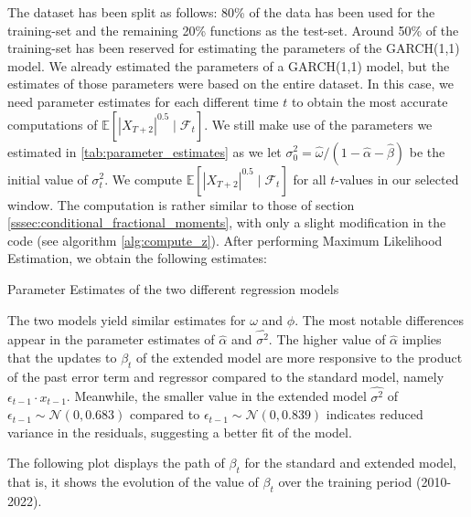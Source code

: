 The dataset has been split as follows: 80\% of the data has been used for the training-set and the remaining 20\% functions as the test-set. Around 50\% of the training-set has been reserved for estimating the parameters of the GARCH(1,1) model. We already estimated the parameters of a GARCH(1,1) model, but the estimates of those parameters were based on the entire dataset. In this case, we need parameter estimates for each different time \(t\) to obtain the most accurate computations of \(\mathbb{E}[|X_{T + 2}|^{0.5} \mid \mathcal{F}_t]\). We still make use of the parameters we estimated in \ref{tab:parameter_estimates} as we let \(\sigma^2_0 = \hat{\omega} / ( 1 - \hat{\alpha} - \hat{\beta})\) be the initial value of \(\sigma^2_t\). We compute \(\mathbb{E}[|X_{T + 2}|^{0.5} \mid \mathcal{F}_t]\) for all \(t\)-values in our selected window. The computation is rather similar to those of section \ref{sssec:conditional_fractional_moments}, with only a slight modification in the code (see algorithm \ref{alg:compute_z}).
After performing Maximum Likelihood Estimation, we obtain the following estimates:
\begin{table}[H]
    \centering

\caption{Parameter Estimates of the two different regression models} 
\label{tab:observation_model}
\end{table}
The two models yield similar estimates for \(\omega\) and \(\phi\). 
The most notable differences appear in the parameter estimates of \(\hat{\alpha}\) and \(\hat{\sigma^2}\). The higher value of  \(\hat{\alpha}\) implies that the updates to \(\beta_t\) of the extended model are more responsive to the product of the past error term and regressor compared to the standard model, namely \(\epsilon_{t -1} \cdot x_{t-1}\). Meanwhile, the smaller value in the extended model \(\hat{\sigma^2}\) of \(\epsilon_{t-1} \sim \mathcal{N}(0, 0.683)\) compared to \(\epsilon_{t-1} \sim \mathcal{N}(0, 0.839)\) indicates reduced variance in the residuals, suggesting a better fit of the model. 

The following plot displays the path of \(\beta_t\) for the standard and extended model, that is, it shows the evolution of the value of \(\beta_t\) over the training period (2010-2022).

